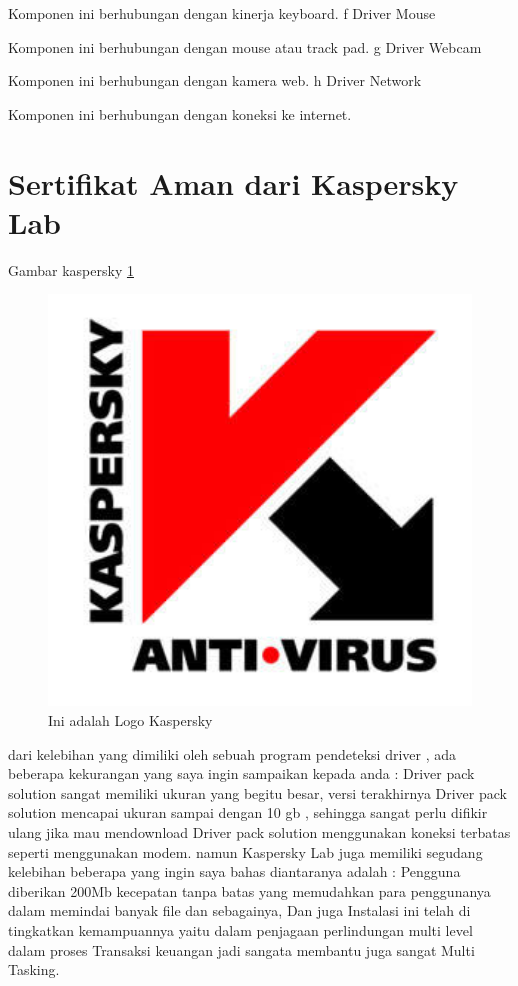  Komponen ini berhubungan dengan kinerja keyboard.
f	Driver Mouse

 Komponen ini berhubungan dengan mouse atau track pad.
g	Driver Webcam 

 Komponen ini berhubungan dengan kamera web.
h	Driver Network 

 Komponen ini berhubungan dengan koneksi ke internet.


\section{Sertifikat Aman dari Kaspersky Lab}

Gambar kaspersky \ref{Kaspersky}

  \begin{figure}[ht]
  \centerline{\includegraphics[width=1\textwidth]{../figures/Kaspersky.jpg}}
  \caption{Ini adalah Logo Kaspersky}
  \label{Kaspersky}
  \end{figure}

dari kelebihan yang dimiliki oleh sebuah program pendeteksi driver , ada beberapa kekurangan yang saya ingin sampaikan kepada anda  :
Driver pack solution sangat memiliki ukuran yang begitu besar,  versi terakhirnya Driver pack solution mencapai ukuran sampai dengan 10 gb , sehingga sangat perlu difikir ulang jika mau  mendownload Driver pack solution menggunakan koneksi terbatas seperti menggunakan modem.
namun Kaspersky Lab juga memiliki segudang kelebihan beberapa yang ingin saya bahas diantaranya adalah :
Pengguna diberikan 200Mb kecepatan tanpa batas yang memudahkan para penggunanya dalam memindai banyak file dan sebagainya, Dan juga Instalasi ini telah di tingkatkan kemampuannya yaitu dalam penjagaan perlindungan multi level dalam proses Transaksi keuangan jadi sangata membantu juga sangat Multi Tasking.

